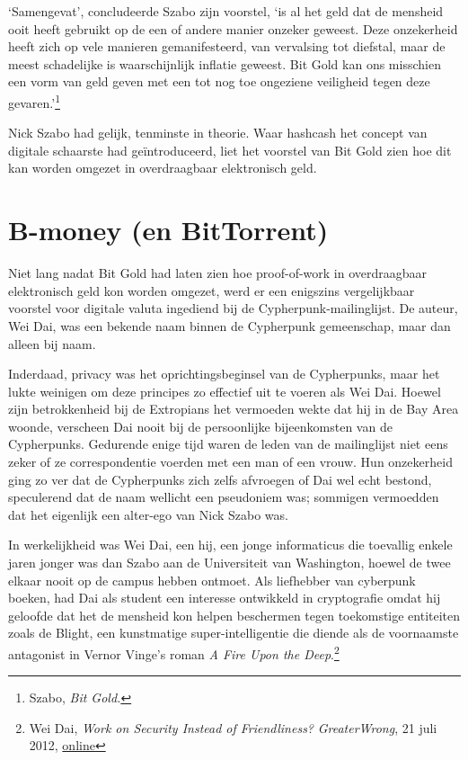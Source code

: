 \documentclass[
  a5paper,
  smalldemyvopaper,11pt,twoside,onecolumn,openright,extrafontsizes,
hidelinks]{memoir}
\begin{document}
`Samengevat', concludeerde Szabo zijn voorstel, `is al het geld dat de
mensheid ooit heeft gebruikt op de een of andere manier onzeker geweest.
Deze onzekerheid heeft zich op vele manieren gemanifesteerd, van
vervalsing tot diefstal, maar de meest schadelijke is waarschijnlijk
inflatie geweest. Bit Gold kan ons misschien een vorm van geld geven met
een tot nog toe ongeziene veiligheid tegen deze gevaren.'\footnote{Szabo,
  \emph{Bit Gold.}}

Nick Szabo had gelijk, tenminste in theorie. Waar hashcash het concept
van digitale schaarste had geïntroduceerd, liet het voorstel van Bit
Gold zien hoe dit kan worden omgezet in overdraagbaar elektronisch geld.

\chapter{B-money (en BitTorrent)}\label{b-money-en-bittorrent}

Niet lang nadat Bit Gold had laten zien hoe proof-of-work in
overdraagbaar elektronisch geld kon worden omgezet, werd er een
enigszins vergelijkbaar voorstel voor digitale valuta ingediend bij de
Cypherpunk-mailinglijst. De auteur, Wei Dai, was een bekende naam binnen
de Cypherpunk gemeenschap, maar dan alleen bij naam.

Inderdaad, privacy was het oprichtingsbeginsel van de Cypherpunks, maar
het lukte weinigen om deze principes zo effectief uit te voeren als Wei
Dai. Hoewel zijn betrokkenheid bij de Extropians het vermoeden wekte dat
hij in de Bay Area woonde, verscheen Dai nooit bij de persoonlijke
bijeenkomsten van de Cypherpunks. Gedurende enige tijd waren de leden
van de mailinglijst niet eens zeker of ze correspondentie voerden met
een man of een vrouw. Hun onzekerheid ging zo ver dat de Cypherpunks
zich zelfs afvroegen of Dai wel echt bestond, speculerend dat de naam
wellicht een pseudoniem was; sommigen vermoedden dat het eigenlijk een
alter-ego van Nick Szabo was.

In werkelijkheid was Wei Dai, een hij, een jonge informaticus die
toevallig enkele jaren jonger was dan Szabo aan de Universiteit van
Washington, hoewel de twee elkaar nooit op de campus hebben ontmoet. Als
liefhebber van cyberpunk boeken, had Dai als student een interesse
ontwikkeld in cryptografie omdat hij geloofde dat het de mensheid kon
helpen beschermen tegen toekomstige entiteiten zoals de Blight, een
kunstmatige super-intelligentie die diende als de voornaamste antagonist
in Vernor Vinge's roman \emph{A Fire Upon the Deep}.\footnote{Wei Dai,
  \emph{Work on Security Instead of Friendliness?} \emph{GreaterWrong},
  21 juli 2012,
  \href{https://www.greaterwrong.com/posts/m8FjhuELdg7iv6boW/work-on-security-instead-of-friendliness}{online}}
\end{document}
